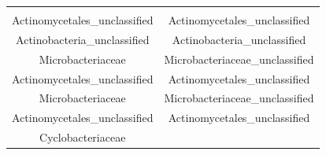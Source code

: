 \documentclass[]{article}
\begin{document}
\begin{longtable}[]{@{}cc@{}}
\begin{minipage}[t]{0.42\columnwidth}
\end{minipage}\tabularnewline
\begin{minipage}[t]{0.42\columnwidth}\centering\strut
Actinomycetales\_unclassified\strut
\end{minipage} & \begin{minipage}[t]{0.42\columnwidth}\centering\strut
Actinomycetales\_unclassified\strut
\end{minipage}\tabularnewline
\begin{minipage}[t]{0.42\columnwidth}\centering\strut
Actinobacteria\_unclassified\strut
\end{minipage} & \begin{minipage}[t]{0.42\columnwidth}\centering\strut
Actinobacteria\_unclassified\strut
\end{minipage}\tabularnewline
\begin{minipage}[t]{0.42\columnwidth}\centering\strut
Microbacteriaceae\strut
\end{minipage} & \begin{minipage}[t]{0.42\columnwidth}\centering\strut
Microbacteriaceae\_unclassified\strut
\end{minipage}\tabularnewline
\begin{minipage}[t]{0.42\columnwidth}\centering\strut
Actinomycetales\_unclassified\strut
\end{minipage} & \begin{minipage}[t]{0.42\columnwidth}\centering\strut
Actinomycetales\_unclassified\strut
\end{minipage}\tabularnewline
\begin{minipage}[t]{0.42\columnwidth}\centering\strut
Microbacteriaceae\strut
\end{minipage} & \begin{minipage}[t]{0.42\columnwidth}\centering\strut
Microbacteriaceae\_unclassified\strut
\end{minipage}\tabularnewline
\begin{minipage}[t]{0.42\columnwidth}\centering\strut
Actinomycetales\_unclassified\strut
\end{minipage} & \begin{minipage}[t]{0.42\columnwidth}\centering\strut
Actinomycetales\_unclassified\strut
\end{minipage}\tabularnewline
\begin{minipage}[t]{0.42\columnwidth}\centering\strut
Cyclobacteriaceae\strut
\end{minipage} & \begin{minipage}[t]{0.42\columnwidth}\centering\strut

\end{minipage}
\end{longtable}
\end{document}
